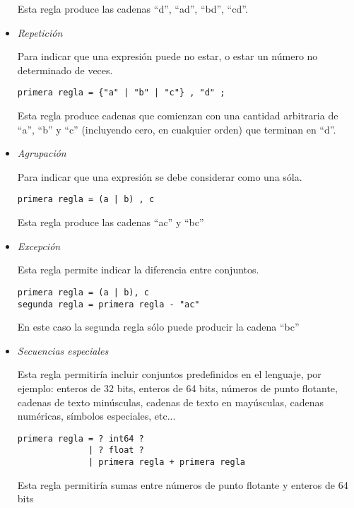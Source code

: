 \documentclass[12pt]{article}
\begin{document}
\begin{itemize}
Esta regla produce las cadenas ``d'', ``ad'', ``bd'', ``cd''.

\item \textit{Repetición}

  Para indicar que una expresión puede no estar, o estar un número no determinado de veces.

\begin{verbatim}
primera regla = {"a" | "b" | "c"} , "d" ;
\end{verbatim}

Esta regla produce cadenas que comienzan con una cantidad arbitraria de ``a'', ``b'' y ``c'' (incluyendo cero, en cualquier orden) que terminan en ``d''.

\item \textit{Agrupación}

  Para indicar que una expresión se debe considerar como una sóla.

\begin{verbatim}
primera regla = (a | b) , c 
\end{verbatim}

Esta regla produce las cadenas ``ac'' y ``bc''

\item \textit{Excepción}

  Esta regla permite indicar la diferencia entre conjuntos.

\begin{verbatim}
primera regla = (a | b), c
segunda regla = primera regla - "ac"
\end{verbatim}

En este caso la segunda regla sólo puede producir la cadena ``bc''

\item \textit{Secuencias especiales}

  Esta regla permitiría incluir conjuntos predefinidos en el lenguaje, por ejemplo: enteros de 32 bits, enteros de 64 bits, números de punto flotante, cadenas de texto minúsculas, cadenas de texto en mayúsculas, cadenas numéricas, símbolos especiales, etc...

\begin{verbatim}
primera regla = ? int64 ?
              | ? float ?
              | primera regla + primera regla
\end{verbatim}

Esta regla permitiría sumas entre números de punto flotante y enteros de 64 bits

\end{itemize}
\end{document}
